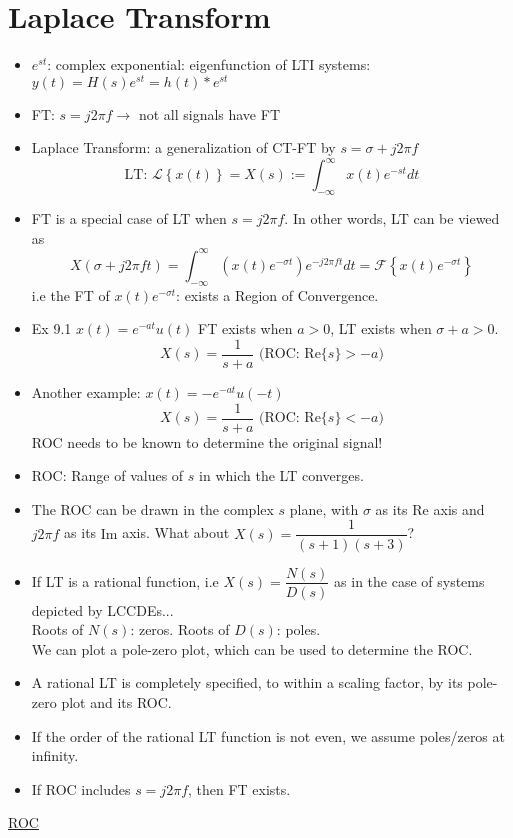 \documentclass{article}
\newcommand{\ft}[1]{\mathcal{F}\left\{#1\right\}}
\newcommand{\lt}[1]{\mathcal{L}\left\{#1\right\}}
\begin{document}
\section{Laplace Transform}
\begin{itemize}
    \item $e^{st}$: complex exponential: eigenfunction of LTI systems: $y(t)=H(s)e^{st}=h(t)*e^{st}$
    \item FT: $s=j2\pi f\rightarrow$ not all signals have FT
    \item Laplace Transform: a generalization of CT-FT by $s=\sigma+j2\pi f$
    \[\text{LT: }\lt{x(t)}=X(s):=\int_{-\infty}^{\infty}x(t)e^{-st}dt\]
    \item FT is a special case of LT when $s=j2\pi f$. In other words, LT can be viewed as 
    \[X(\sigma + j2\pi ft) = \int_{-\infty}^{\infty}(x(t)e^{-\sigma t})e^{-j2\pi ft}dt = \ft{x(t)e^{-\sigma t}}\]
    i.e the FT of $x(t)e^{-\sigma t}$: exists a Region of Convergence.
    \item Ex 9.1 $x(t)=e^{-at}u(t)$ FT exists when $a > 0$, LT exists when $\sigma +a> 0$.
    \[X(s)=\frac{1}{s+a}\text{ (ROC: }\mathrm{Re}\{s\} > -a)\]
    \item Another example: $x(t)=-e^{-at}u(-t)$
    \[X(s)=\frac{1}{s+a}\text{ (ROC: }\mathrm{Re}\{s\} < -a)\]
    ROC needs to be known to determine the original signal!
    \item ROC: Range of values of $s$ in which the LT converges.
    \item The ROC can be drawn in the complex $s$ plane, with $\sigma$ as its $\mathrm{Re}$ axis and $j2\pi f$ as its $\mathrm{Im}$ axis. What about $X(s)=\dfrac{1}{(s+1)(s+3)}$?
    \item If LT is a rational function, i.e $X(s)=\dfrac{N(s)}{D(s)}$ as in the case of systems depicted by LCCDEs...\\
    Roots of $N(s)$: zeros. Roots of $D(s)$: poles.\\
    We can plot a pole-zero plot, which can be used to determine the ROC.
    \item A rational LT is completely specified, to within a scaling factor, by its pole-zero plot and its ROC.
    \item If the order of the rational LT function is not even, we assume poles/zeros at infinity.
    \item If ROC includes $s = j2\pi f$, then FT exists. 
\end{itemize}
\underline{ROC}
\end{document}
